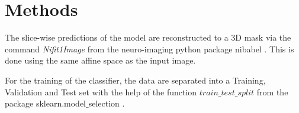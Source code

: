 \section{Methods}
The slice-wise predictions of the model are reconstructed to a 3D mask via the command \textit{Nifit1Image} from the neuro-imaging python package nibabel \cite{noauthor_neuroimaging_nodate}.
This is done using the same affine space as the input image.

For the training of the classifier, the data are separated into a Training, Validation and Test set with the help of the function \textcolor{mg}{\texttt{$train\_test\_split$}} from the package sklearn.model$\_$selection \cite{noauthor_scikit-learn/scikit-learn_2020}.